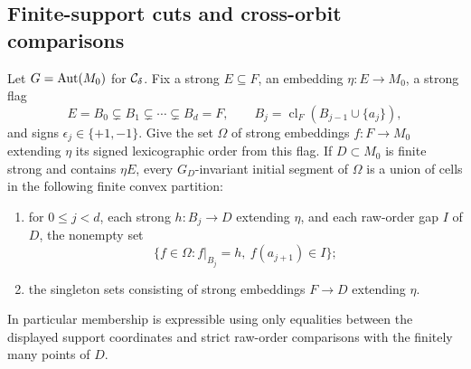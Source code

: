 \subsection{Finite-support cuts and cross-orbit comparisons}

\begin{lemma}
\label{G:smooth-lex-cuts}
Let $G=\operatorname{Aut}(M_0)$ for $\mathcal C_\delta$. Fix a strong $E\subseteq F$,
an embedding $\eta:E\to M_0$, a strong flag
\[
 E=B_0\subsetneq B_1\subsetneq\cdots\subsetneq B_d=F,
 \qquad B_j=\operatorname{cl}_F(B_{j-1}\cup\{a_j\}),
\]
and signs $\epsilon_j\in\{+1,-1\}$. Give the set $\Omega$ of
strong embeddings $f:F\to M_0$ extending $\eta$ its signed
lexicographic order from this flag. If $D\subset M_0$ is finite
strong and contains $\eta E$, every $G_D$-invariant initial
segment of $\Omega$ is a union of cells in the following finite
convex partition:
\begin{enumerate}
\item for $0\le j<d$, each strong $h:B_j\to D$ extending
$\eta$, and each raw-order gap $I$ of $D$, the nonempty set
\[
 \{f\in\Omega:f|_{B_j}=h,\ f(a_{j+1})\in I\};
 \tag{OC.1}
\]
\item the singleton sets consisting of strong embeddings
$F\to D$ extending $\eta$.
\end{enumerate}
In particular membership is expressible using only equalities
between the displayed support coordinates and strict raw-order
comparisons with the finitely many points of $D$.
\end{lemma}
